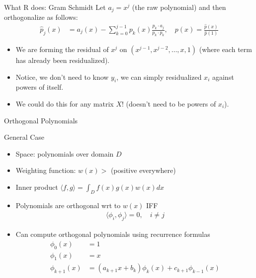 \begin{frame}{What R does: Gram Schmidt}
Let $a_j = x^j$ (the raw polynomial) and then \alert{orthogonalize} as follows:
\begin{align*}
\hat{p}_{j}(x)&=a_{j}(x)-\sum_{k=0}^{j-1} p_{k}(x) \frac{p_{k} \cdot a_{j}}{p_{k} \cdot p_{k}}, \quad 
p(x)=\frac{\hat{p}(x)}{ \hat{p}(1)}
\end{align*}
\begin{itemize}
\item We are forming the \alert{residual} of $x^j$ on $(x^{j-1}, x^{j-2},\ldots, x, 1)$ (where each term has already been residualized).
\item Notice, we don't need to know $y_i$, we can simply residualized $x_i$ against powers of itself.
\item We could do this for any matrix $X$! (doesn't need to be powers of $x_i$).
\end{itemize}
\end{frame}


\begin{frame}{Orthogonal Polynomials}
\small
\begin{block}{General Case}
\begin{itemize}
\item Space: polynomials over domain $D$
\item Weighting function: $w(x) > $ (positive everywhere)
\item Inner product $\langle f,g \rangle = \int_D f(x) g(x) w(x) d x$
\item Polynomials are orthogonal wrt to $w(x)$ IFF 
\begin{align*}
\langle \phi_i, \phi_j \rangle = 0, \quad i \neq j
\end{align*}
\item Can compute orthogonal polynomials using recurrence formulas
\begin{align*}
\phi_0(x)&= 1\\
\phi_1(x) &= x \\
\phi_{k+1}(x) &= (a_{k+1} x + b_k) \phi_k(x) + c_{k+1} \phi_{k-1}(x)
\end{align*}
\end{itemize}
\end{block}
\end{frame}

